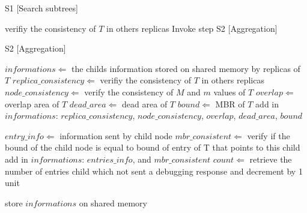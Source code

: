 \medskip
\begin{center}
\begin{minipage}{1\textwidth}
\begin{algorithm2e}[H]
\SetAlFnt{\small\sf}
 \DontPrintSemicolon
 \LinesNumbered
\SetAlgoLined
 \BlankLine
 \BlankLine
	
 S1 [Search subtrees]

{
  verifiy the consistency of $T$ in others replicas\;
	Invoke step S2 [Aggregation]\;
}

S2 [Aggregation]

$informations \Leftarrow$ the childs information stored on shared memory by replicas of $T$\;
$replica\_consistency \Leftarrow$ verifiy the consistency of $T$ in others replicas\;
$node\_consistency \Leftarrow$	verify the consistency of $M$ and $m$ values of  $T$\;
$overlap \Leftarrow$ overlap area of $T$\;
$dead\_area \Leftarrow$ dead area of $T$\;
$bound \Leftarrow$ MBR of $T$\;
add in $informations$: $replica\_consistency$, $node\_consistency$, $overlap$, $dead\_area$, $bound$\;

{
	  $entry\_info \Leftarrow$ information sent by child node\;
    $mbr\_consistent \Leftarrow$ verify if the bound of the child node is equal to bound of entry of T that points to this child\;
    add in $informations$: $entries\_info$, and $mbr\_consistent$\;
		$count \Leftarrow$ retrieve the number of entries child which not sent a debugging response and decrement by 1 unit\;
		
		{
			store $informations$ on shared memory\;
		}
            
}
\caption{$RDebug(T)$ 
\label {alg:rdebug}}
\end{algorithm2e}
\end{minipage}
\end{center}

